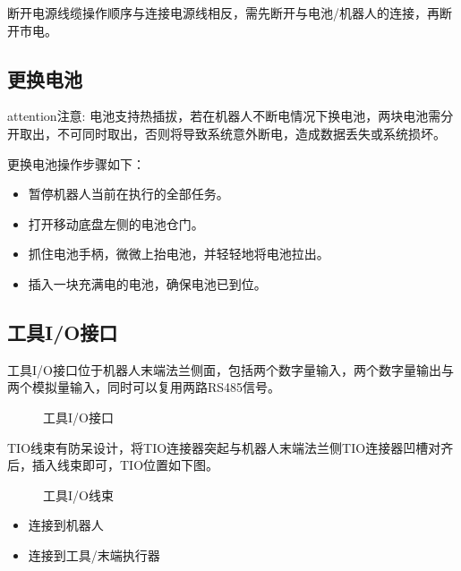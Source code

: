 \documentclass[a4paper,11pt,english,openany,oneside]{sphinxmanual}
\begin{document}
\sphinxAtStartPar
断开电源线缆操作顺序与连接电源线相反，需先断开与电池/机器人的连接，再断开市电。


\subsection{更换电池}
\label{\detokenize{08 _u5b89_u88c5_u4e0e_u8c03_u8bd5:id29}}\label{\detokenize{08 _u5b89_u88c5_u4e0e_u8c03_u8bd5:id30}}
\begin{sphinxadmonition}{attention}{注意:}
\sphinxAtStartPar
电池支持热插拔，若在机器人不断电情况下换电池，两块电池需分开取出，不可同时取出，否则将导致系统意外断电，造成数据丢失或系统损坏。
\end{sphinxadmonition}

\sphinxAtStartPar
更换电池操作步骤如下：
\begin{itemize}
\item {} 
\sphinxAtStartPar
暂停机器人当前在执行的全部任务。

\item {} 
\sphinxAtStartPar
打开移动底盘左侧的电池仓门。

\item {} 
\sphinxAtStartPar
抓住电池手柄，微微上抬电池，并轻轻地将电池拉出。

\item {} 
\sphinxAtStartPar
插入一块充满电的电池，确保电池已到位。

\end{itemize}


\subsection{工具I/O接口}
\label{\detokenize{08 _u5b89_u88c5_u4e0e_u8c03_u8bd5:i-o}}\label{\detokenize{08 _u5b89_u88c5_u4e0e_u8c03_u8bd5:id31}}
\sphinxAtStartPar
工具I/O接口位于机器人末端法兰侧面，包括两个数字量输入，两个数字量输出与两个模拟量输入，同时可以复用两路RS485信号。

\begin{figure}[H]
\centering
\capstart

\noindent{}
\caption{工具I/O接口}\label{\detokenize{08 _u5b89_u88c5_u4e0e_u8c03_u8bd5:id97}}\end{figure}



\sphinxAtStartPar
TIO线束有防呆设计，将TIO连接器突起与机器人末端法兰侧TIO连接器凹槽对齐后，插入线束即可，TIO位置如下图。

\begin{figure}[H]
\centering
\capstart

\noindent{}
\caption{工具I/O线束}\label{\detokenize{08 _u5b89_u88c5_u4e0e_u8c03_u8bd5:id98}}\end{figure}
\begin{itemize}
\item {} 
 连接到机器人

\item {} 
 连接到工具/末端执行器

\end{itemize}
\end{document}
